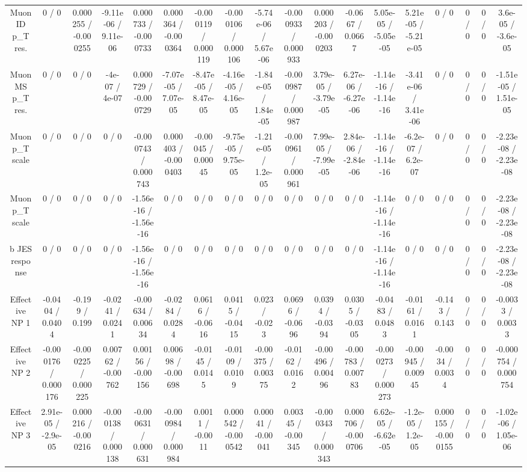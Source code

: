 \documentclass[10pt]{article}
\begin{document}
\begin{table}[htbp]
\begin{center}
\begin{tabular}{|c|c|c|c|c|c|c|c|c|c|c|c|c|c|c|c|c|c|}
  Muon ID p_{T} res. & 0 / 0 & 0.000255 / -0.000255 & -9.11e-06 / 9.11e-06 & 0.000733 / -0.000733 & 0.000364 / -0.000364 & -0.000119 / 0.000119 & -0.000106 / 0.000106 & -5.74e-06 / 5.67e-06 & -0.000933 / 0.000933 & 0.000203 / -0.000203 & -0.0667 / 0.0667 & 5.05e-05 / -5.05e-05 & 5.21e-05 / -5.21e-05 & 0 / 0 & 0 / 0 & 0 / 0 & 3.6e-05 / -3.6e-05 \\ 
  Muon MS p_{T} res. & 0 / 0 & 0 / 0 & -4e-07 / 4e-07 & 0.000729 / -0.000729 & -7.07e-05 / 7.07e-05 & -8.47e-05 / 8.47e-05 & -4.16e-05 / 4.16e-05 & -1.84e-05 / 1.84e-05 & -0.000987 / 0.000987 & 3.79e-05 / -3.79e-05 & 6.27e-06 / -6.27e-06 & -1.14e-16 / -1.14e-16 & -3.41e-06 / 3.41e-06 & 0 / 0 & 0 / 0 & 0 / 0 & -1.51e-05 / 1.51e-05 \\ 
  Muon p_{T} scale & 0 / 0 & 0 / 0 & 0 / 0 & -0.000743 / 0.000743 & 0.000403 / -0.000403 & -0.00045 / 0.00045 & -9.75e-05 / 9.75e-05 & -1.21e-05 / 1.2e-05 & -0.000961 / 0.000961 & 7.99e-05 / -7.99e-05 & 2.84e-06 / -2.84e-06 & -1.14e-16 / -1.14e-16 & -6.2e-07 / 6.2e-07 & 0 / 0 & 0 / 0 & 0 / 0 & -2.23e-08 / -2.23e-08 \\ 
  Muon p_{T} scale & 0 / 0 & 0 / 0 & 0 / 0 & -1.56e-16 / -1.56e-16 & 0 / 0 & 0 / 0 & 0 / 0 & 0 / 0 & 0 / 0 & 0 / 0 & 0 / 0 & -1.14e-16 / -1.14e-16 & 0 / 0 & 0 / 0 & 0 / 0 & 0 / 0 & -2.23e-08 / -2.23e-08 \\ 
  b JES response & 0 / 0 & 0 / 0 & 0 / 0 & -1.56e-16 / -1.56e-16 & 0 / 0 & 0 / 0 & 0 / 0 & 0 / 0 & 0 / 0 & 0 / 0 & 0 / 0 & -1.14e-16 / -1.14e-16 & 0 / 0 & 0 / 0 & 0 / 0 & 0 / 0 & -2.23e-08 / -2.23e-08 \\ 
  Effective NP 1 & -0.0404 / 0.0404 & -0.199 / 0.199 & -0.0241 / 0.0241 & -0.00634 / 0.00634 & -0.0284 / 0.0284 & 0.0616 / -0.0616 & 0.0415 / -0.0415 & 0.023 / -0.023 & 0.0696 / -0.0696 & 0.0394 / -0.0394 & 0.0305 / -0.0305 & -0.0483 / 0.0483 & -0.0161 / 0.0161 & -0.143 / 0.143 & 0 / 0 & 0 / 0 & -0.0033 / 0.0033 \\ 
  Effective NP 2 & -0.000176 / 0.000176 & -0.000225 / 0.000225 & 0.00762 / -0.00762 & 0.00156 / -0.00156 & 0.00698 / -0.00698 & -0.0145 / 0.0145 & -0.0109 / 0.0109 & -0.00375 / 0.00375 & -0.0162 / 0.0162 & -0.00496 / 0.00496 & -0.00783 / 0.00783 & -0.000273 / 0.000273 & -0.00945 / 0.00945 & -0.0034 / 0.0034 & 0 / 0 & 0 / 0 & -0.000754 / 0.000754 \\ 
  Effective NP 3 & 2.91e-05 / -2.9e-05 & 0.000216 / -0.000216 & -0.000138 / 0.000138 & -0.000631 / 0.000631 & -0.000984 / 0.000984 & 0.0011 / -0.0011 & 0.000542 / -0.000542 & 0.00041 / -0.00041 & 0.00345 / -0.00345 & -0.000343 / 0.000343 & 0.000706 / -0.000706 & 6.62e-05 / -6.62e-05 & -1.2e-05 / 1.2e-05 & 0.000155 / -0.000155 & 0 / 0 & 0 / 0 & -1.02e-06 / 1.05e-06 \\ 

\end{tabular}
\end{center}
\end{table}
\end{document}
